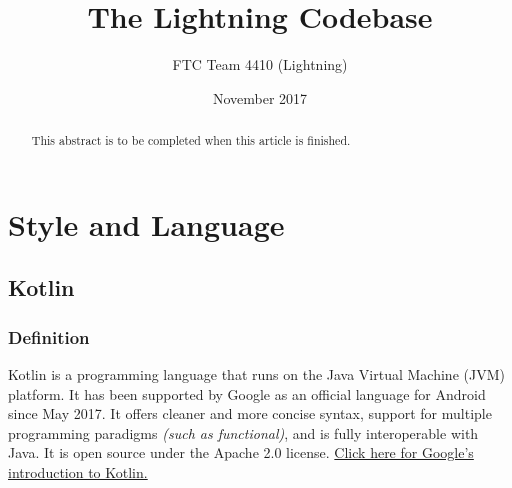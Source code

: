 \documentclass[letterpaper]{article}
\begin{document}
\title{The Lightning Codebase}
\author{FTC Team 4410 (Lightning)}
\date{November 2017}
\maketitle

\begin{abstract}
This abstract is to be completed when this article is finished.
\end{abstract}
\section{Style and Language}

\subsection{Kotlin}

\subsubsection{Definition}
Kotlin is a programming language that runs on the Java Virtual Machine (JVM) platform. It has been supported by Google as an official language for Android since May 2017. It offers cleaner and more concise syntax, support for multiple programming paradigms \textit{(such as functional)}, and is fully interoperable with Java. It is open source under the Apache 2.0 license. \href{https://developer.android.com/kotlin/index.html}{Click here for Google's introduction to Kotlin.}
\end{document}
